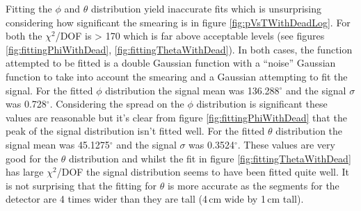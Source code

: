 Fitting the $\phi$ and $\theta$ distribution yield inaccurate fits which is unsurprising considering how significant the smearing is in figure \ref{fig:pVsTWithDeadLog}. For both the $\chi^2$/DOF is > 170 which is far above acceptable levels (see figures \ref{fig:fittingPhiWithDead}, \ref{fig:fittingThetaWithDead}). In both cases, the function attempted to be fitted is a double Gaussian function with a ``noise'' Gaussian function to take into account the smearing and a Gaussian attempting to fit the signal. For the fitted $\phi$ distribution the signal mean was 136.288$^\circ$ and the signal $\sigma$ was 0.728$^\circ$. Considering the spread on the $\phi$ distribution is significant these values are reasonable but it's clear from figure \ref{fig:fittingPhiWithDead} that the peak of the signal distribution isn't fitted well. For the fitted $\theta$ distribution the signal mean was 45.1275$^\circ$ and the signal $\sigma$ was 0.3524$^\circ$. These values are very good for the $\theta$ distribution and whilst the fit in figure \ref{fig:fittingThetaWithDead} has large $\chi^2$/DOF  the signal distribution seems to have been fitted quite well. It is not surprising that the fitting for $\theta$ is more accurate as the segments for the detector are 4 times wider than they are tall (4\,cm wide by 1\,cm tall). 


